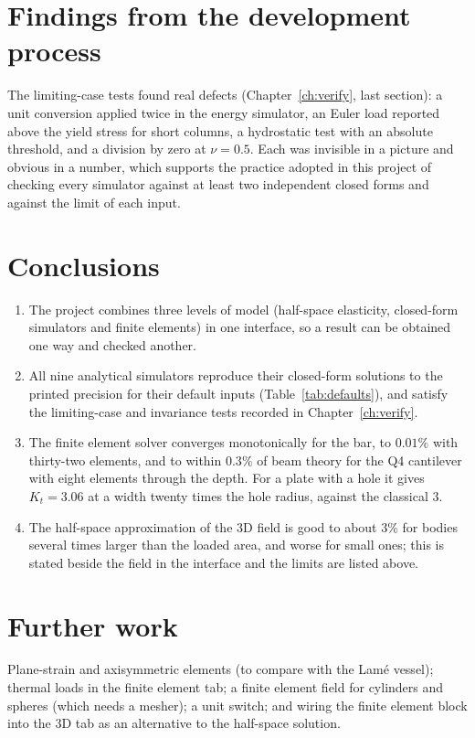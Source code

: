 \section{Findings from the development process}
The limiting-case tests found real defects (Chapter~\ref{ch:verify}, last section): a unit conversion applied twice in the energy simulator, an Euler load reported above the yield stress for short columns, a hydrostatic test with an absolute threshold, and a division by zero at $\nu=0.5$. Each was invisible in a picture and obvious in a number, which supports the practice adopted in this project of checking every simulator against at least two independent closed forms and against the limit of each input.

\section{Conclusions}
\begin{enumerate}
\item The project combines three levels of model (half-space elasticity, closed-form simulators and finite elements) in one interface, so a result can be obtained one way and checked another.
\item All nine analytical simulators reproduce their closed-form solutions to the printed precision for their default inputs (Table~\ref{tab:defaults}), and satisfy the limiting-case and invariance tests recorded in Chapter~\ref{ch:verify}.
\item The finite element solver converges monotonically for the bar, to $0.01\%$ with thirty-two elements, and to within $0.3\%$ of beam theory for the Q4 cantilever with eight elements through the depth. For a plate with a hole it gives $K_t=3.06$ at a width twenty times the hole radius, against the classical $3$.
\item The half-space approximation of the 3D field is good to about $3\%$ for bodies several times larger than the loaded area, and worse for small ones; this is stated beside the field in the interface and the limits are listed above.
\end{enumerate}

\section{Further work}
Plane-strain and axisymmetric elements (to compare with the Lam\'e vessel); thermal loads in the finite element tab; a finite element field for cylinders and spheres (which needs a mesher); a unit switch; and wiring the finite element block into the 3D tab as an alternative to the half-space solution.

